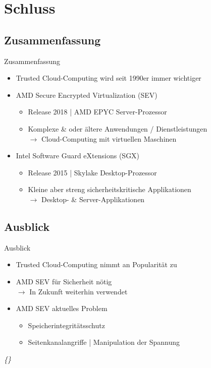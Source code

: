 \documentclass{sdqbeamer}
\begin{document}
\section{Schluss}
\subsection{Zusammenfassung}
\begin{frame}{Zusammenfassung}
	\begin{itemize}
		\item Trusted Cloud-Computing wird seit 1990er immer wichtiger
		\item AMD Secure Encrypted Virtualization (SEV)
		\begin{itemize}
			\item Release 2018 | AMD EPYC Server-Prozessor
			\item Komplexe \& oder ältere Anwendungen / Dienstleistungen\\
				\(\rightarrow\) Cloud-Computing mit virtuellen Maschinen
		\end{itemize}
		\item Intel Software Guard eXtensions (SGX)
		\begin{itemize}
			\item Release 2015 | Skylake Desktop-Prozessor
			\item Kleine aber streng sicherheitskritische Applikationen\\
				\(\rightarrow\) Desktop- \& Server-Applikationen
		\end{itemize}
	\end{itemize}
\end{frame}

\subsection{Ausblick}
\begin{frame}{Ausblick}
	\begin{itemize}
		\item Trusted Cloud-Computing nimmt an Popularität zu
		\item AMD SEV für Sicherheit nötig \\
			\(\rightarrow\) In Zukunft weiterhin verwendet
		\item AMD SEV aktuelles Problem
		\begin{itemize}
			\item Speicherintegritätsschutz
			\item Seitenkanalangriffe | Manipulation der Spannung
		\end{itemize}
	\end{itemize}
	\vfill
	\small\textit{\{\cite{computerbase}\}}
\end{frame}
\end{document}

